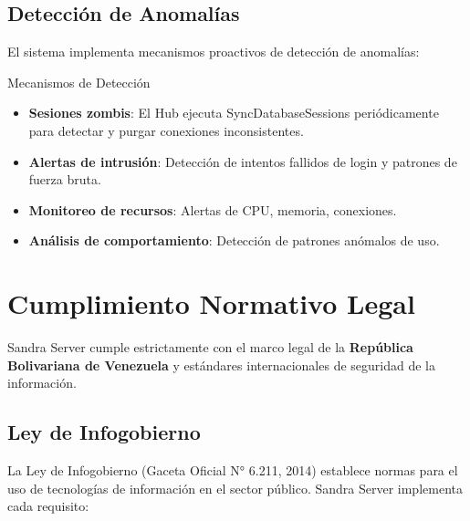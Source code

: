 \subsection{Detección de Anomalías}

El sistema implementa mecanismos proactivos de detección de anomalías:

\begin{caja}{Mecanismos de Detección}
\begin{itemize}
\item \textbf{Sesiones zombis}: El Hub ejecuta SyncDatabaseSessions periódicamente para detectar y purgar conexiones inconsistentes.
\item \textbf{Alertas de intrusión}: Detección de intentos fallidos de login y patrones de fuerza bruta.
\item \textbf{Monitoreo de recursos}: Alertas de CPU, memoria, conexiones.
\item \textbf{Análisis de comportamiento}: Detección de patrones anómalos de uso.
\end{itemize}
\end{caja}

\newpage

\section{Cumplimiento Normativo Legal}

Sandra Server cumple estrictamente con el marco legal de la \textbf{República Bolivariana de Venezuela} y estándares internacionales de seguridad de la información.

\subsection{Ley de Infogobierno}

La Ley de Infogobierno (Gaceta Oficial N° 6.211, 2014) establece normas para el uso de tecnologías de información en el sector público. Sandra Server implementa cada requisito:

